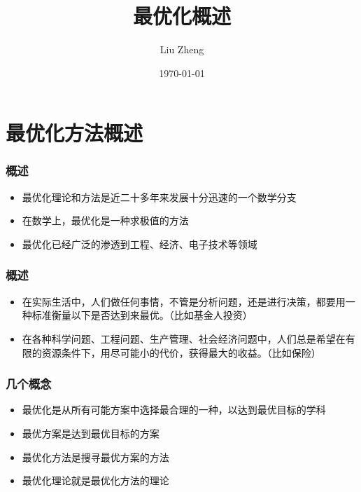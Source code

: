 \documentclass[slidestop,compress,mathserif,c]{beamer}
\title{最优化概述}
\author{Liu Zheng}
\date{\today}
\institute{同济大学电信学院}
\begin{document}
\frame{\titlepage}

\section{最优化方法概述}


\begin{frame}
\frametitle{概述}
\begin{itemize}
    \item 最优化理论和方法是近二十多年来发展十分迅速的一个数学分支
    \item 在数学上，最优化是一种求极值的方法
    \item 最优化已经广泛的渗透到工程、经济、电子技术等领域
\end{itemize}

\end{frame}


\begin{frame}
\frametitle{概述}
\begin{itemize}
    \item 在实际生活中，人们做任何事情，不管是分析问题，还是进行决策，都要用一种标准衡量以下是否达到来最优。（比如基金人投资）
    \item 在各种科学问题、工程问题、生产管理、社会经济问题中，人们总是希望在有限的资源条件下，用尽可能小的代价，获得最大的收益。（比如保险）
\end{itemize}
\end{frame}

\begin{frame}
\frametitle{几个概念}
\begin{itemize}
    \item 最优化是从所有可能方案中选择最合理的一种，以达到最优目标的学科
    \item 最优方案是达到最优目标的方案
    \item 最优化方法是搜寻最优方案的方法
    \item 最优化理论就是最优化方法的理论
\end{itemize}

\end{frame}
\end{document}
